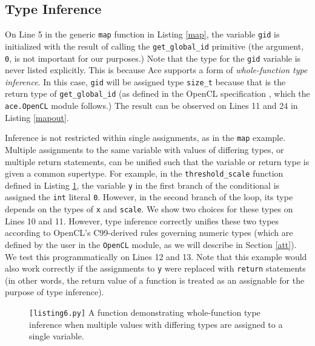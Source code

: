 \documentclass[10pt]{sigplanconf}
\begin{document}
\subsection{Type Inference}
On Line 5 in the generic \verb|map| function in Listing \ref{map}, the variable \verb|gid| is initialized with the result of calling the \verb|get_global_id| primitive (the argument, \verb|0|, is not important for our purposes.)  Note that the type for the \verb|gid| variable is never listed explicitly. This is because Ace supports a form of {\em whole-function type inference}. In this case, \verb|gid| will be assigned type \verb|size_t| because that is the return type of \verb|get_global_id| (as defined in the OpenCL specification \cite{opencl}, which the \verb|ace.OpenCL| module follows.) The result can be observed on Lines 11 and 24 in Listing \ref{mapout}. 

Inference is not restricted within single assignments, as in the \verb|map| example. Multiple assignments to the same variable with values of differing types, or multiple return statements, can be unified such that the variable or return type is given a common supertype. For example, in the \verb|threshold_scale| function defined in Listing \ref{inference}, the variable \verb|y| in the first branch of the conditional is assigned the \verb|int| literal \verb|0|. However, in the second branch of the loop, its type depends on the types of \verb|x| and \verb|scale|. We show two choices for these types on Lines 10 and 11. However, type inference correctly unifies these two types according to OpenCL's C99-derived rules governing numeric types (which are defined by the user in the \verb|OpenCL| module, as we will describe in Section \ref{att}). We test this programmatically on Lines 12 and 13. Note that this example would also work correctly if the assignments to \verb|y| were replaced with \verb|return| statements (in other words, the return value of a function is treated as an assignable for the purpose of type inference).

\begin{figure}

\caption{\texttt{[listing6.py]} A function demonstrating whole-function type inference when multiple values with differing types are assigned to a single variable.}
\label{inference}
\end{figure}
\end{document}
